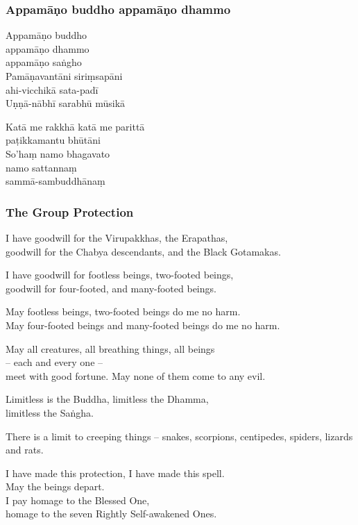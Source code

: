 \subsubsection{Appamāṇo buddho appamāṇo dhammo}



Appamāṇo buddho\\\vin appamāṇo dhammo\\\vin appamāṇo saṅgho\\
Pamāṇavantāni siriṃsapāni\\\vin ahi-vicchikā sata-padī\\
Uṇṇā-nābhī sarabhū mūsikā

Katā me rakkhā katā me parittā\\\vin paṭikkamantu bhūtāni\\
So'haṃ namo bhagavato\\\vin namo sattannaṃ\\\vin sammā-sambuddhānaṃ 

\subsubsection{The Group Protection}

I have goodwill for the Virupakkhas, the Erapathas,\\
goodwill for the Chabya descendants, and the Black Gotamakas.

I have goodwill for footless beings, two-footed beings,\\
goodwill for four-footed, and many-footed beings.

May footless beings, two-footed beings do me no harm.\\
May four-footed beings and many-footed beings do me no harm.

May all creatures, all breathing things, all beings\\\vin -- each and every one --\\
meet with good fortune. May none of them come to any evil.

Limitless is the Buddha, limitless the Dhamma,\\\vin limitless the Saṅgha.

There is a limit to creeping things -- snakes, scorpions, centipedes, spiders,
lizards and rats.

I have made this protection, I have made this spell.\\
May the beings depart.\\
I pay homage to the Blessed One,\\
homage to the seven Rightly Self-awakened Ones.

